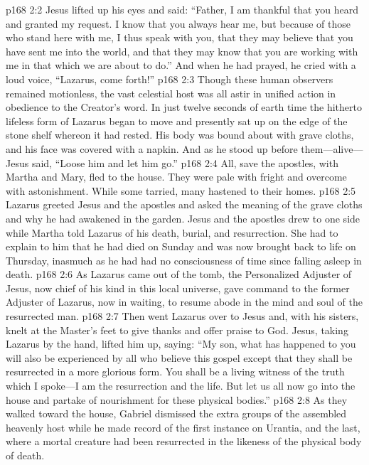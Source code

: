 \vs p168 2:2 Jesus lifted up his eyes and said: \textcolor{ubdarkred}{“Father, I am thankful that you heard and granted my request. I know that you always hear me, but because of those who stand here with me, I thus speak with you, that they may believe that you have sent me into the world, and that they may know that you are working with me in that which we are about to do.”} And when he had prayed, he cried with a loud voice, “Lazarus, come forth!”
\vs p168 2:3 Though these human observers remained motionless, the vast celestial host was all astir in unified action in obedience to the Creator’s word. In just twelve seconds of earth time the hitherto lifeless form of Lazarus began to move and presently sat up on the edge of the stone shelf whereon it had rested. His body was bound about with grave cloths, and his face was covered with a napkin. And as he stood up before them---alive---Jesus said, \textcolor{ubdarkred}{“Loose him and let him go.”}
\vs p168 2:4 All, save the apostles, with Martha and Mary, fled to the house. They were pale with fright and overcome with astonishment. While some tarried, many hastened to their homes.
\vs p168 2:5 Lazarus greeted Jesus and the apostles and asked the meaning of the grave cloths and why he had awakened in the garden. Jesus and the apostles drew to one side while Martha told Lazarus of his death, burial, and resurrection. She had to explain to him that he had died on Sunday and was now brought back to life on Thursday, inasmuch as he had had no consciousness of time since falling asleep in death.
\pc \vs p168 2:6 As Lazarus came out of the tomb, the Personalized Adjuster of Jesus, now chief of his kind in this local universe, gave command to the former Adjuster of Lazarus, now in waiting, to resume abode in the mind and soul of the resurrected man.
\pc \vs p168 2:7 Then went Lazarus over to Jesus and, with his sisters, knelt at the Master’s feet to give thanks and offer praise to God. Jesus, taking Lazarus by the hand, lifted him up, saying: \textcolor{ubdarkred}{“My son, what has happened to you will also be experienced by all who believe this gospel except that they shall be resurrected in a more glorious form. You shall be a living witness of the truth which I spoke---I am the resurrection and the life. But let us all now go into the house and partake of nourishment for these physical bodies.”}
\pc \vs p168 2:8 As they walked toward the house, Gabriel dismissed the extra groups of the assembled heavenly host while he made record of the first instance on Urantia, and the last, where a mortal creature had been resurrected in the likeness of the physical body of death.
